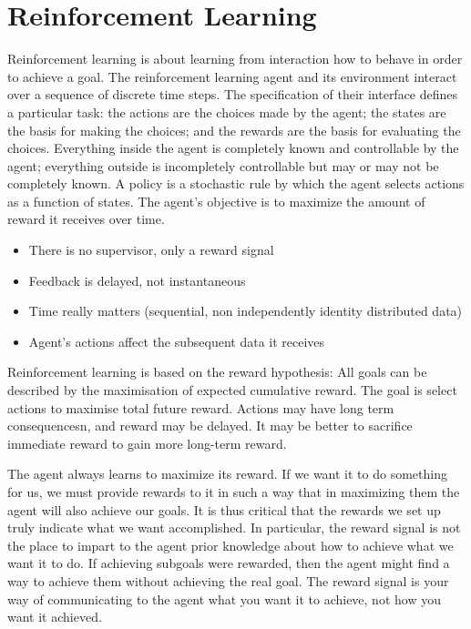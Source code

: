\documentclass{article}
\begin{document}
\section{Reinforcement Learning}

Reinforcement learning is about learning from interaction how to behave in order to achieve a goal. 
The reinforcement learning agent and its environment interact over a sequence of discrete time steps. 
The specification of their interface defines a particular task: the actions are the choices made by the agent; 
the states are the basis for making the choices; and the rewards are the basis for evaluating the choices. 
Everything inside the agent is completely known and controllable by the agent; 
everything outside is incompletely controllable but may or may not be completely known. 
A policy is a stochastic rule by which the agent selects actions as a function of states. 
The agent's objective is to maximize the amount of reward it receives over time.

\begin{itemize}
    \item There is no supervisor, only a reward signal
    \item Feedback is delayed, not instantaneous
    \item Time really matters (sequential, non independently identity distributed data)
    \item Agent’s actions affect the subsequent data it receives
\end{itemize}

Reinforcement learning is based on the reward hypothesis: 
All goals can be described by the maximisation of expected cumulative reward. 
The goal is select actions to maximise total future reward. 
Actions may have long term consequencesn, and reward may be delayed. 
It may be better to sacrifice immediate reward to gain more long-term reward.

The agent always learns to maximize its reward. 
If we want it to do something for us, we must provide rewards to it in such a way that in maximizing them the agent will also achieve our goals. 
It is thus critical that the rewards we set up truly indicate what we want accomplished. 
In particular, the reward signal is not the place to impart to the agent prior knowledge about how to achieve what we want it to do. 
If achieving subgoals were rewarded, then the agent might find a way to achieve them without achieving the real goal. 
The reward signal is your way of communicating to the agent what you want it to achieve, not how you want it achieved. 
\end{document}
